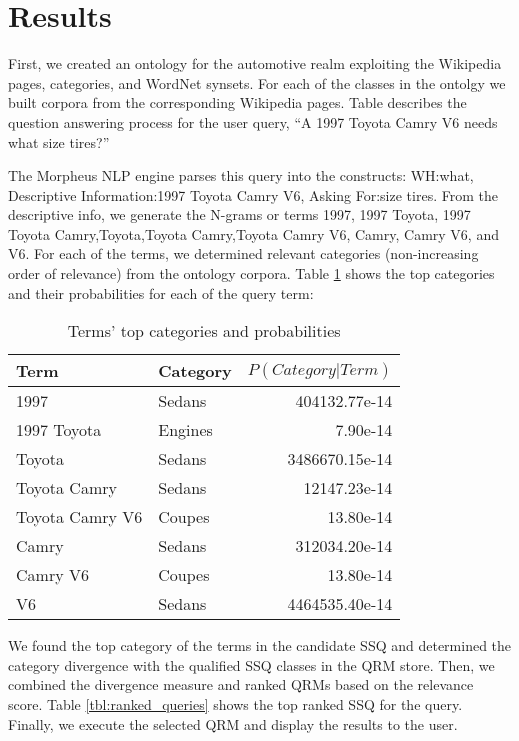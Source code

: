 \section{Results}
\label{sec:results}


First, we created an ontology for the automotive realm exploiting the Wikipedia pages, categories, and WordNet synsets. For each of the classes in the ontolgy we built corpora from the corresponding Wikipedia pages. Table describes the question answering process for the user query, ``A 1997 Toyota Camry V6 needs what size tires?''

The Morpheus NLP engine parses this query into the constructs: WH:what,
Descriptive Information:1997 Toyota Camry V6, Asking For:size tires. From the
descriptive info, we generate the N-grams or terms 1997, 1997 Toyota, 1997
Toyota Camry,Toyota,Toyota Camry,Toyota Camry V6, Camry, Camry V6, and V6. For
each of the terms, we determined relevant categories (non-increasing order of
relevance) from the ontology corpora. Table \ref{tbl:term_categories} shows
the top categories and their probabilities for each of the query term: 

\begin{table}[h]\footnotesize

\begin{tabular}{| p{3.2cm} | l | r |}
\hline 
Term & Category & $P(Category|Term)$ \\ \hline
1997 & Sedans & 404132.77e-14\\ 
1997 Toyota & Engines & 7.90e-14\\ 
Toyota  & Sedans & 3486670.15e-14\\ 
Toyota Camry & Sedans & 12147.23e-14\\ 
Toyota Camry V6 & Coupes & 13.80e-14\\ 
Camry & Sedans & 312034.20e-14\\ 
Camry V6 & Coupes & 13.80e-14\\ 
V6 & Sedans & 4464535.40e-14\\ \hline
\end{tabular}        

\caption{Terms' top categories and probabilities}
\label{tbl:term_categories}   

\end{table}

We found the top category of the terms in the candidate SSQ and determined the category divergence with the qualified SSQ classes in the QRM store. Then, we combined the divergence measure and
ranked QRMs based on the relevance score. Table \ref{tbl:ranked_queries} shows the top ranked SSQ for the query.  Finally, we execute the selected QRM and display the results to the user.

